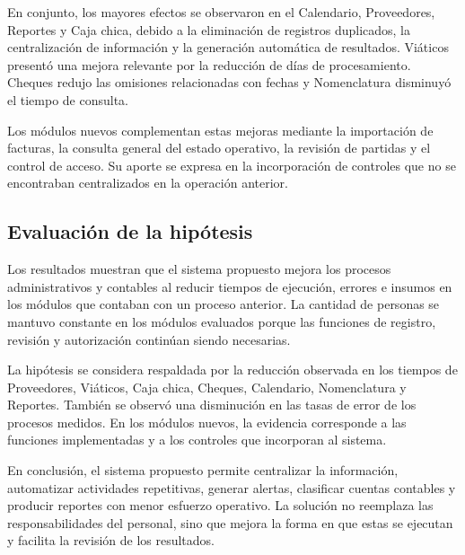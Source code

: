En conjunto, los mayores efectos se observaron en el Calendario, Proveedores, Reportes y Caja chica, debido a la eliminación de registros duplicados, la centralización de información y la generación automática de resultados. Viáticos presentó una mejora relevante por la reducción de días de procesamiento. Cheques redujo las omisiones relacionadas con fechas y Nomenclatura disminuyó el tiempo de consulta.

Los módulos nuevos complementan estas mejoras mediante la importación de facturas, la consulta general del estado operativo, la revisión de partidas y el control de acceso. Su aporte se expresa en la incorporación de controles que no se encontraban centralizados en la operación anterior.

\subsection{Evaluación de la hipótesis}

Los resultados muestran que el sistema propuesto mejora los procesos administrativos y contables al reducir tiempos de ejecución, errores e insumos en los módulos que contaban con un proceso anterior. La cantidad de personas se mantuvo constante en los módulos evaluados porque las funciones de registro, revisión y autorización continúan siendo necesarias.

La hipótesis se considera respaldada por la reducción observada en los tiempos de Proveedores, Viáticos, Caja chica, Cheques, Calendario, Nomenclatura y Reportes. También se observó una disminución en las tasas de error de los procesos medidos. En los módulos nuevos, la evidencia corresponde a las funciones implementadas y a los controles que incorporan al sistema.

En conclusión, el sistema propuesto permite centralizar la información, automatizar actividades repetitivas, generar alertas, clasificar cuentas contables y producir reportes con menor esfuerzo operativo. La solución no reemplaza las responsabilidades del personal, sino que mejora la forma en que estas se ejecutan y facilita la revisión de los resultados.
